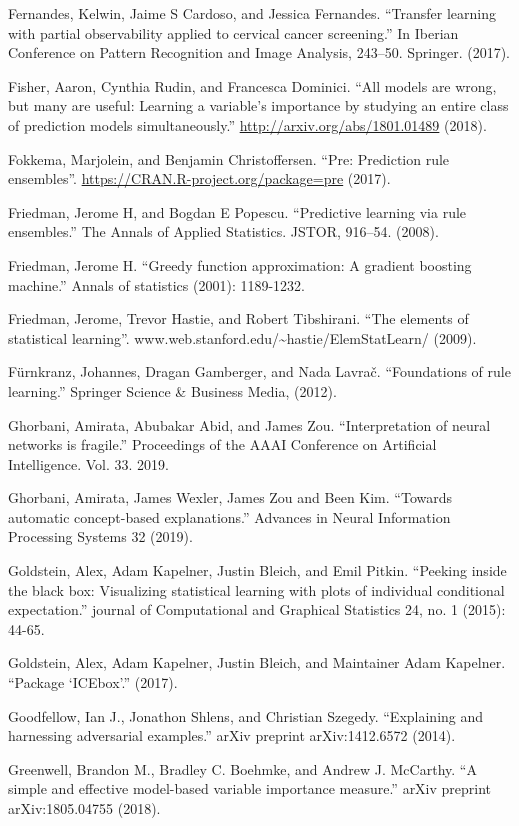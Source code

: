 \documentclass[
  10pt,
]{scrbook}
\begin{document}
Fernandes, Kelwin, Jaime S Cardoso, and Jessica Fernandes. ``Transfer learning with partial observability applied to cervical cancer screening.'' In Iberian Conference on Pattern Recognition and Image Analysis, 243--50. Springer. (2017).

Fisher, Aaron, Cynthia Rudin, and Francesca Dominici. ``All models are wrong, but many are useful: Learning a variable's importance by studying an entire class of prediction models simultaneously.'' \url{http://arxiv.org/abs/1801.01489} (2018).

Fokkema, Marjolein, and Benjamin Christoffersen. ``Pre: Prediction rule ensembles''. \url{https://CRAN.R-project.org/package=pre} (2017).

Friedman, Jerome H, and Bogdan E Popescu. ``Predictive learning via rule ensembles.'' The Annals of Applied Statistics. JSTOR, 916--54. (2008).

Friedman, Jerome H. ``Greedy function approximation: A gradient boosting machine.'' Annals of statistics (2001): 1189-1232.

Friedman, Jerome, Trevor Hastie, and Robert Tibshirani. ``The elements of statistical learning''. www.web.stanford.edu/\textasciitilde hastie/ElemStatLearn/ (2009).

Fürnkranz, Johannes, Dragan Gamberger, and Nada Lavrač. ``Foundations of rule learning.'' Springer Science \& Business Media, (2012).

Ghorbani, Amirata, Abubakar Abid, and James Zou. ``Interpretation of neural networks is fragile.'' Proceedings of the AAAI Conference on Artificial Intelligence. Vol. 33. 2019.

Ghorbani, Amirata, James Wexler, James Zou and Been Kim. ``Towards automatic concept-based explanations.'' Advances in Neural Information Processing Systems 32 (2019).

Goldstein, Alex, Adam Kapelner, Justin Bleich, and Emil Pitkin. ``Peeking inside the black box: Visualizing statistical learning with plots of individual conditional expectation.'' journal of Computational and Graphical Statistics 24, no. 1 (2015): 44-65.

Goldstein, Alex, Adam Kapelner, Justin Bleich, and Maintainer Adam Kapelner. ``Package `ICEbox'.'' (2017).

Goodfellow, Ian J., Jonathon Shlens, and Christian Szegedy. ``Explaining and harnessing adversarial examples.'' arXiv preprint arXiv:1412.6572 (2014).

Greenwell, Brandon M., Bradley C. Boehmke, and Andrew J. McCarthy. ``A simple and effective model-based variable importance measure.'' arXiv preprint arXiv:1805.04755 (2018).
\end{document}
